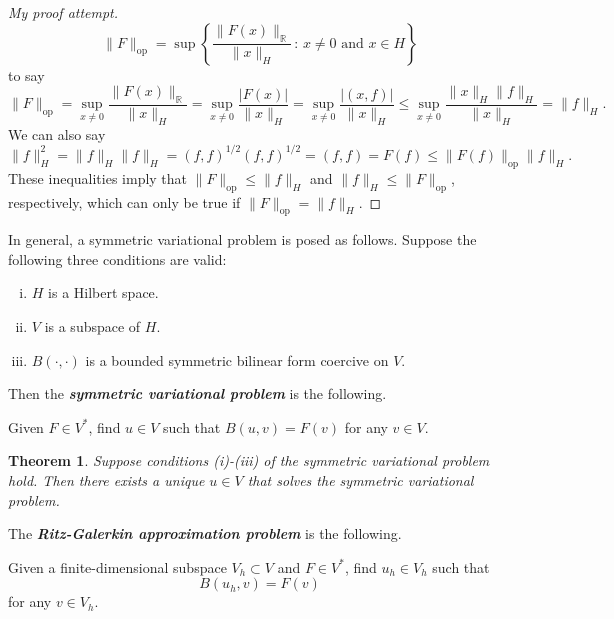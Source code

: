 \documentclass[11pt]{article}
\newtheorem{theorem}{Theorem}
\theoremstyle{definition}
\begin{document}
\begin{proof}[My proof attempt]
	\begin{equation*}
		\|F\|_{\text{op}} = \sup\left\{\frac{\|F(x)\|_{\mathbb{R}}}{\|x\|_H}\, : \, x \not= 0 \text{ and } x \in H\right\}
	\end{equation*}
	to say
	\begin{equation*}
		\|F\|_{\text{op}} = \sup_{x\not=0}{\frac{\|F(x)\|_{\mathbb{R}}}{\|x\|_H}} = \sup_{x\not=0}{\frac{|F(x)|}{\|x\|_H}} = \sup_{x\not=0}{\frac{|(x,f)|}{\|x\|_H}} \leq \sup_{x\not=0}{\frac{\|x\|_H\|f\|_H}{\|x\|_H}} = \|f\|_H.
	\end{equation*}
	We can also say
	\begin{equation*}
		\|f\|_H^2 = \|f\|_H\|f\|_H = (f,f)^{1/2}(f,f)^{1/2} = (f,f) = F(f) \leq \|F(f)\|_{\text{op}}\|f\|_H.
	\end{equation*}
	These inequalities imply that $\|F\|_{\text{op}} \leq \|f\|_H$ and $\|f\|_H \leq \|F\|_{\text{op}}$, respectively, which can only be true if $\|F\|_{\text{op}} = \|f\|_H$.
\end{proof}

In general, a symmetric variational problem is posed as follows. Suppose the following three conditions are valid:
\begin{enumerate}[(i)]
	\item $H$ is a Hilbert space.
	\item $V$ is a subspace of $H$. 
	\item $B(\cdot, \cdot)$ is a bounded symmetric bilinear form coercive on $V$.
\end{enumerate}
Then the \textit{\textbf{symmetric variational problem}} is the following.
\begin{displayquote}
	Given $F \in V^*$, find $u \in V$ such that $B(u,v) = F(v)$ for any $v \in V$.
\end{displayquote}

\begin{theorem}
	Suppose conditions (i)-(iii) of the symmetric variational problem hold. Then there exists a unique $u \in V$
	that solves the symmetric variational problem.
\end{theorem}

The \textit{\textbf{Ritz-Galerkin approximation problem}} is the following.
\begin{displayquote}
	Given a finite-dimensional subspace $V_h \subset V$ and $F \in V^*$,
	find $u_h \in V_h$ such that
	\begin{equation*}
		B(u_h,v) = F(v)
	\end{equation*}
	for any $v \in V_h$.
\end{displayquote}
\end{document}
